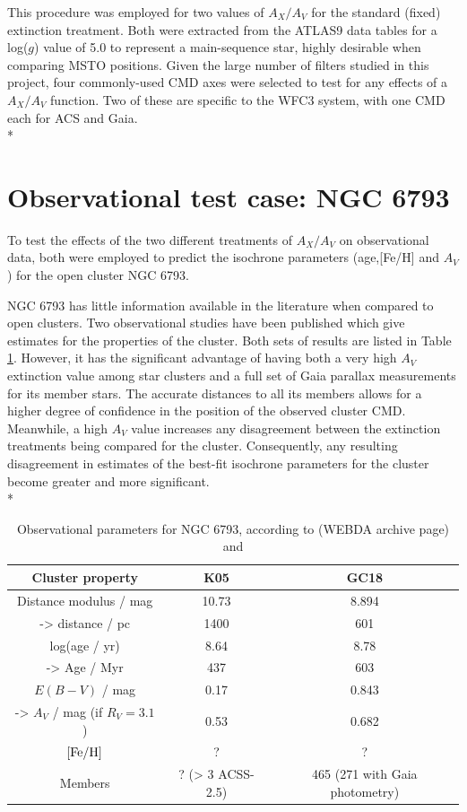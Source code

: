 \documentclass[12pt, a4paper]{report}
\begin{document}
This procedure was employed for two values of $A_{X}/A_{V}$ for the standard (fixed) extinction treatment. Both were extracted from the ATLAS9 data tables for a log($g$) value of 5.0 to represent a main-sequence star, highly desirable when comparing MSTO positions. Given the large number of filters studied in this project, four commonly-used CMD axes were selected to test for any effects of a $A_{X}/A_{V}$ function. Two of these are specific to the WFC3 system, with one CMD each for ACS and Gaia.\\*

\section{Observational test case: NGC 6793}
To test the effects of the two different treatments of $A_{X}/A_{V}$ on observational data, both were employed to predict the isochrone parameters (age,[Fe/H] and $A_{V}$) for the open cluster NGC 6793.

NGC 6793 has little information available in the literature when compared to open clusters. Two observational studies have been published which give estimates for the properties of the cluster. Both sets of results are listed in Table \ref{NGC6793_obs}. However, it has the significant advantage of having both a very high $A_{V}$ extinction value among star clusters and a full set of Gaia parallax measurements for its member stars. The accurate distances to all its members allows for a higher degree of confidence in the position of the observed cluster CMD. Meanwhile, a high $A_{V}$ value increases any disagreement between the extinction treatments being compared for the cluster. Consequently, any resulting disagreement in estimates of the best-fit isochrone parameters for the cluster become greater and more significant. \\*

\begin{table}
\begin{center}
\begin{tabular}{ccc}
\hline
Cluster property & K05 & GC18 \\
\hline
Distance modulus / mag & 10.73 & 8.894 \\
-> distance / pc & 1400 & 601 \\
log(age / yr) & 8.64 & 8.78 \\
-> Age / Myr & 437 & 603 \\
$E(B-V)$ / mag & 0.17 & 0.843 \\
-> $A_{V}$ / mag (if $R_{V} = 3.1$) & 0.53 & 0.682 \\
$\textnormal{[Fe/H]}$ & ? & ? \\
Members & ? (> 3 ACSS-2.5) & 465 (271 with Gaia photometry) \\
\hline
\end{tabular}
\caption{Observational parameters for NGC 6793, according to \cite{2005A&A...438.1163K} (WEBDA archive page) and \cite{2018A&A...616A..10G}}
\label{NGC6793_obs}
\end{center}
\end{table}
\end{document}
